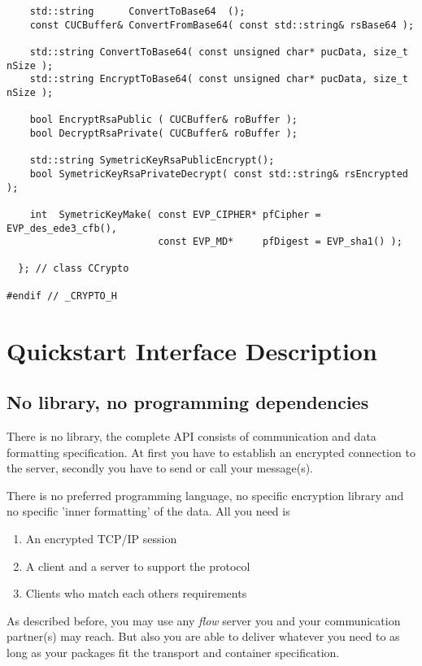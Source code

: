 \documentclass[twoside,a4paper,english,12pt,authoryear,openright]{book}
\newcommand{\flow}{\textit{flow} }
\begin{document}
\begin{lstlisting}
    std::string      ConvertToBase64  ();
    const CUCBuffer& ConvertFromBase64( const std::string& rsBase64 );

    std::string ConvertToBase64( const unsigned char* pucData, size_t nSize );
    std::string EncryptToBase64( const unsigned char* pucData, size_t nSize );

    bool EncryptRsaPublic ( CUCBuffer& roBuffer );
    bool DecryptRsaPrivate( CUCBuffer& roBuffer );

    std::string SymetricKeyRsaPublicEncrypt();
    bool SymetricKeyRsaPrivateDecrypt( const std::string& rsEncrypted );

    int  SymetricKeyMake( const EVP_CIPHER* pfCipher = EVP_des_ede3_cfb(),
                          const EVP_MD*     pfDigest = EVP_sha1() );

  }; // class CCrypto

#endif // _CRYPTO_H
\end{lstlisting}



\chapter{Quickstart Interface Description}

\section{No library, no programming dependencies}

There is no library, the complete API consists of communication and data formatting specification. At first you have to establish an encrypted connection to the server, secondly you have to send or call your message(s).

There is no preferred programming language, no specific encryption library and no specific 'inner formatting' of the data. All you need is

\begin{enumerate}
\item{An encrypted TCP/IP session}
\item{A client and a server to support the protocol}
\item{Clients who match each others requirements}
\end{enumerate}

As described before, you may use any \flow server you and your communication partner(s) may reach. But also you are able to deliver whatever you need to as long as your packages fit the transport and container specification.
\end{document}
